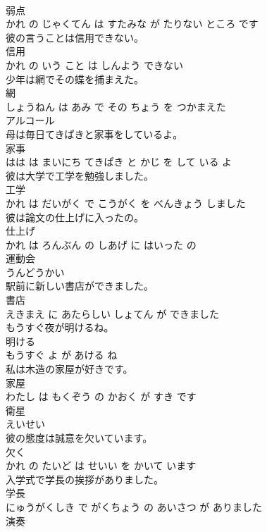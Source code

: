 \documentclass[8pt]{extreport}
\begin{document}
\begin{CJK}{UTF8}{min}
\\	弱点 
\\	かれ の じゃくてん は すたみな が たりない ところ です			
\\	彼の言うことは信用できない。	
\\	信用 
\\	かれ の いう こと は しんよう できない			
\\	少年は網でその蝶を捕まえた。	
\\	網 
\\	しょうねん は あみ で その ちょう を つかまえた			
\\	アルコール	
\\	母は毎日てきぱきと家事をしているよ。	
\\	家事 
\\	はは は まいにち てきぱき と かじ を して いる よ			
\\	彼は大学で工学を勉強しました。	
\\	工学 
\\	かれ は だいがく で こうがく を べんきょう しました			
\\	彼は論文の仕上げに入ったの。	
\\	仕上げ 
\\	かれ は ろんぶん の しあげ に はいった の			
\\	運動会	
\\	うんどうかい			
\\	駅前に新しい書店ができました。	
\\	書店 
\\	えきまえ に あたらしい しょてん が できました			
\\	もうすぐ夜が明けるね。	
\\	明ける 
\\	もうすぐ よ が あける ね			
\\	私は木造の家屋が好きです。	
\\	家屋 
\\	わたし は もくぞう の かおく が すき です			
\\	衛星	
\\	えいせい			
\\	彼の態度は誠意を欠いています。	
\\	欠く 
\\	かれ の たいど は せいい を かいて います			
\\	入学式で学長の挨拶がありました。	
\\	学長 
\\	にゅうがくしき で がくちょう の あいさつ が ありました			
\\	演奏	

\end{CJK}
\end{document}
